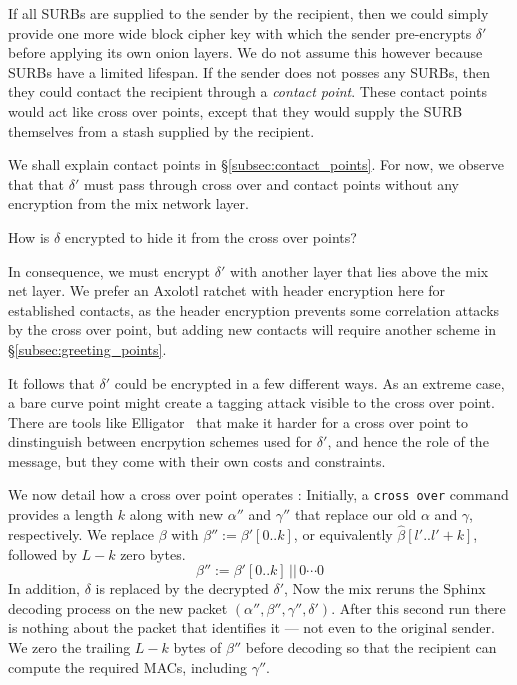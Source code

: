 If all SURBs are supplied to the sender by the recipient, then
we could simply provide one more wide block cipher key with which
the sender pre-encrypts $\delta'$ before applying its own onion layers.
We do not assume this however because SURBs have a limited lifespan. 
If the sender does not posses any SURBs, then they could contact the
recipient through a {\em contact point}.  These contact points would
act like cross over points, except that they would supply the SURB
themselves from a stash supplied by the recipient.
  
We shall explain contact points in \S\ref{subsec:contact_points}.
For now, we observe that that $\delta'$ must pass through cross over
and contact points without any encryption from the mix network layer. 

\begin{issue}
How is $\delta$ encrypted to hide it from the cross over points?
\end{issue}

In consequence, we must encrypt $\delta'$ with another layer that
lies above the mix net layer.  We prefer an Axolotl ratchet with
header encryption here for established contacts, as the header
encryption prevents some correlation attacks by the cross over
point, but adding new contacts will require another scheme in
\S\ref{subsec:greeting_points}.  

It follows that $\delta'$ could be encrypted in a few different ways.
As an extreme case, a bare curve point might create a tagging attack
visible to the cross over point.  
There are tools like Elligator~\cite{elligator} that make it harder
for a cross over point to dinstinguish between encrpytion schemes
used for $\delta'$, and hence the role of the message, but they
come with their own costs and constraints. 

\smallskip

We now detail how a cross over point operates : 
Initially, a {\tt cross over} command provides a length $k$ along
with new $\alpha''$ and $\gamma''$ that replace our old $\alpha$ and
$\gamma$, respectively. 
We replace $\beta$ with $\beta'' := \beta'[0..k]$, or equivalently
$\hat\beta[l'..l'+k]$, followed by $L-k$ zero bytes.
\[ \beta'' :=  \beta'[0..k] \,||\, 0\cdots0 \]
In addition, $\delta$ is replaced by the decrypted $\delta'$, 
Now the mix reruns the Sphinx decoding process on the new packet
$(\alpha'',\beta'',\gamma'',\delta')$. 
After this second run there is nothing about the packet that 
identifies it --- not even to the original sender.
We zero the trailing $L-k$ bytes of $\beta''$ before decoding so that
the recipient can compute the required MACs, including $\gamma''$.

